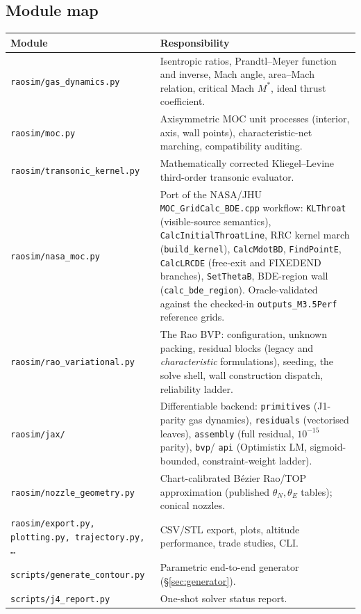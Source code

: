 \documentclass[11pt]{article}
\begin{document}
\subsection{Module map}
\begin{longtable}{p{}p{}}
\toprule
\textbf{Module} & \textbf{Responsibility} \\
\midrule
\texttt{raosim/gas\_dynamics.py} & Isentropic ratios, Prandtl--Meyer
function and inverse, Mach angle, area--Mach relation, critical Mach
$M^*$, ideal thrust coefficient. \\
\texttt{raosim/moc.py} & Axisymmetric MOC unit processes (interior,
axis, wall points), characteristic-net marching, compatibility
auditing.\\
\texttt{raosim/transonic\_kernel.py} & Mathematically corrected
Kliegel--Levine third-order transonic evaluator. \\
\texttt{raosim/nasa\_moc.py} & Port of the NASA/JHU
\texttt{MOC\_GridCalc\_BDE.cpp} workflow: \texttt{KLThroat} (visible-source
semantics), \texttt{CalcInitialThroatLine}, RRC kernel march
(\texttt{build\_kernel}), \texttt{CalcMdotBD}, \texttt{FindPointE},
\texttt{CalcLRCDE} (free-exit and FIXEDEND branches), \texttt{SetThetaB},
BDE-region wall (\texttt{calc\_bde\_region}). Oracle-validated against the
checked-in \texttt{outputs\_M3.5Perf} reference grids. \\
\texttt{raosim/rao\_variational.py} & The Rao BVP: configuration,
unknown packing, residual blocks (legacy and \emph{characteristic}
formulations), seeding, the solve shell, wall construction dispatch,
reliability ladder. \\
\texttt{raosim/jax/} & Differentiable backend: \texttt{primitives}
(J1-parity gas dynamics), \texttt{residuals} (vectorised leaves),
\texttt{assembly} (full residual, $10^{-15}$ parity), \texttt{bvp}/
\texttt{api} (Optimistix LM, sigmoid-bounded, constraint-weight ladder). \\
\texttt{raosim/nozzle\_geometry.py} & Chart-calibrated B\'ezier Rao/TOP
approximation (published $\theta_N,\theta_E$ tables); conical nozzles. \\
\texttt{raosim/export.py, plotting.py, trajectory.py, \ldots} &
CSV/STL export, plots, altitude performance, trade studies, CLI. \\
\texttt{scripts/generate\_contour.py} & Parametric end-to-end generator
(\S\ref{sec:generator}). \\
\texttt{scripts/j4\_report.py} & One-shot solver status report. \\
\bottomrule
\end{longtable}
\end{document}
